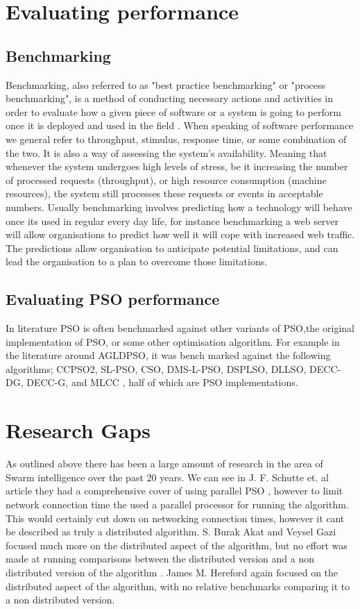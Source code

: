 \documentclass[oneside,12pt]{book}
\begin{document}
\section{Evaluating performance}
\subsection{Benchmarking}
Benchmarking, also referred to as "best practice benchmarking" or "process benchmarking", is  a  method  of  conducting  necessary  actions  and  activities  in  order  to evaluate  how  a  given  piece  of  software  or  a  system  is  going  to perform  once  it  is deployed and used in the field \cite{vokolos1998performance}. When speaking of software performance we general refer to throughput, stimulus, response time, or some combination of the two\cite{vokolos1998performance}.  It is also a way of assessing the system’s availability. Meaning that whenever the system undergoes high levels of stress, be it increasing the number of processed requests (throughput), or high resource consumption (machine resources), the system still processes these requests or events in acceptable numbers\cite{vokolos1998performance}.  Usually benchmarking involves predicting how a technology will behave once its used in regular every day life, for instance benchmarking a web server will allow organisations to predict how well it will cope with increased web traffic. The predictions allow organisation to anticipate potential limitations, and can lead the organisation to a plan to overcome those limitations. 

\subsection{Evaluating PSO performance}
 In literature PSO is often benchmarked against other variants of PSO,the original implementation of PSO, or some other optimisation algorithm. For example in the literature around AGLDPSO, it was bench marked against  the following algorithms; CCPSO2, SL-PSO, CSO, DMS-L-PSO, DSPLSO, DLLSO, DECC-DG, DECC-G, and MLCC \cite{wang2020adaptive}, half of which are PSO implementations. 
 
 
\section{Research Gaps}
As outlined above there has been a large amount of research in the area of Swarm intelligence over the past 20 years. We can see in J. F. Schutte et. al article they had a comprehensive cover of using parallel PSO \cite{schutte2004parallel}, however to limit network connection time the used a parallel processor for running the algorithm. This would certainly cut down on networking connection times, however it cant be described as truly a distributed algorithm. S. Burak Akat and Veysel Gazi focused much more on the distributed aspect of the algorithm, but no effort was made at running comparisons between the distributed version and a non distributed version of the algorithm \cite{akat_gazi_2008}. James M. Hereford again focused on the distributed aspect of the algorithm, with no relative benchmarks comparing it to a non distributed version. \cite{hereford_2006}
\end{document}
